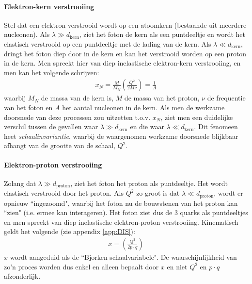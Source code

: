 \documentclass[a4paper,11pt]{article}
\numberwithin{equation}{section} %
\begin{document}
    \paragraph{Elektron-kern verstrooiing}
Stel dat een elektron verstrooid wordt op een atoomkern (bestaande uit meerdere nucleonen).
Als $\lambda \gg d_\text{kern}$, ziet het foton de kern als een puntdeeltje en wordt het elastisch verstrooid op een puntdeeltje met de lading van de kern.
Als $\lambda \ll d_\text{kern}$, dringt het foton diep door in de kern en kan het verstrooid worden op een proton in de kern.
Men spreekt hier van diep inelastische elektron-kern verstrooiing, en men kan het volgende schrijven:
\begin{align}
x_N = \frac{M}{M_N} \left( \frac{Q^2}{2M\nu} \right) = \frac{1}{A}
\end{align}
waarbij $M_N$ de massa van de kern is, $M$ de massa van het proton, $\nu$ de frequentie van het foton en $A$ het aantal nucleonen in de kern.
Als men de werkzame doorsnede van deze processen zou uitzetten t.o.v. $x_N$, ziet men een duidelijke verschil tussen de gevallen waar $\lambda \gg d_\text{kern}$ en die waar $\lambda \ll d_\text{kern}$.
Dit fenomeen heet \textit{schaalinvariantie}, waarbij de waargenomen werkzame doorsnede blijkbaar afhangt van de grootte van de schaal, $Q^2$.

      \paragraph{Elektron-proton verstrooiing}
Zolang dat $\lambda \gg d_\text{proton}$, ziet het foton het proton als puntdeeltje. Het wordt elastisch verstrooid door het proton.
Als $Q^2$ zo groot is dat $\lambda \ll d_\text{proton}$, wordt er opnieuw ``ingezoomd", waarbij het foton nu de bouwstenen van het proton kan “zien" (i.e. ermee kan interageren).
Het foton ziet dus de 3 quarks als puntdeeltjes en men spreekt van diep inelastische elektron-proton verstrooiing.
Kinematisch geldt het volgende (zie appendix \ref{app:DIS}):
\begin{align} \label{eq:Bjorkenx}
x = \left( \frac{Q^2}{2p\cdot q} \right)
\end{align}
$x$ wordt aangeduid als de “Bjorken schaalvariabele".
De waarschijnlijkheid van zo'n proces worden dus enkel en alleen bepaalt door $x$ en niet $Q^2$ en $p\cdot q$ afzonderlijk.
\end{document}
